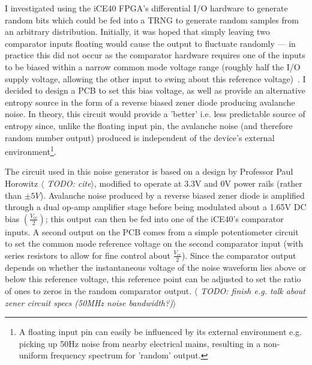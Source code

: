 \documentclass[12pt]{article}
\begin{document}
    I investigated using the iCE40 FPGA's differential I/O hardware to generate random bits which could be fed into a TRNG to generate random samples from an arbitrary distribution. Initially, it was hoped that simply leaving two comparator inputs floating would cause the output to fluctuate randomly --- in practice this did not occur as the comparator hardware requires one of the inputs to be biased within a narrow common mode voltage range (roughly half the I/O supply voltage, allowing the other input to swing about this reference voltage)~\cite{ice40_diff_io}. I decided to design a PCB to set this bias voltage, as well as provide an alternative entropy source in the form of a reverse biased zener diode producing avalanche noise. In theory, this circuit would provide a 'better' i.e. less predictable source of entropy since, unlike the floating input pin, the avalanche noise (and therefore random number output) produced is independent of the device's external environment\footnote{A floating input pin can easily be influenced by its external environment e.g. picking up 50Hz noise from nearby electrical mains, resulting in a non-uniform frequency spectrum for 'random' output.}.

    The circuit used in this noise generator is based on a design by Professor Paul Horowitz \textit{$\langle$ TODO: cite$\rangle$}, modified to operate at 3.3V and 0V power rails (rather than $\pm5V$). Avalanche noise produced by a reverse biased zener diode is amplified through a dual op-amp amplifier stage before being modulated about a 1.65V DC bias $\left(\frac{V_{cc}}{2}\right)$; this output can then be fed into one of the iCE40's comparator inputs. A second output on the PCB comes from a simple potentiometer circuit to set the common mode reference voltage on the second comparator input (with series resistors to allow for fine control about $\frac{V_{cc}}{2}$). Since the comparator output depends on whether the instantaneous voltage of the noise waveform lies above or below this reference voltage, this reference point can be adjusted to set the ratio of ones to zeros in the random comparator output.
    \textit{$\langle$ TODO: finish e.g. talk about zener circuit specs (50MHz noise bandwidth?)$\rangle$}

\end{document}

